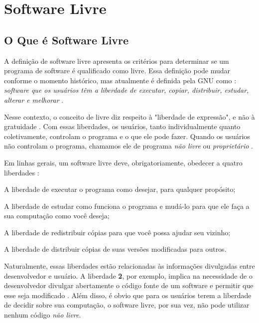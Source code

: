 


\chapter{Software Livre}
\label{chap:SoftwareLivre}

\section{O Que é Software Livre}

A definição de software livre apresenta os critérios para determinar se um programa de software é qualificado como livre. Essa definição pode mudar conforme o momento histórico, mas atualmente é definida pela GNU como : \textit{software que os usuários têm a liberdade de executar, copiar, distribuir, estudar, alterar e melhorar} \cite{Inc2012} . 

Nesse contexto, o conceito de livre diz respeito à "liberdade de expressão", e não à gratuidade \cite{Williams}. Com essas liberdades, os usuários, tanto individualmente quanto coletivamente, controlam o programa e o que ele pode fazer. Quando os usuários não controlam o programa, chamamos ele de programa \textit{não livre} ou \textit{proprietário} \cite{Inc2012}. 

Em linhas gerais, um software livre deve, obrigatoriamente, obedecer a quatro liberdades \cite{Inc2012, Williams, Lessig2002} :
\begin{compactenum}
	\item A liberdade de executar o programa como desejar, para qualquer propósito;
	\item A liberdade de estudar como funciona o programa e mudá-lo para que ele faça a sua computação como você deseja;
	\item A liberdade de redistribuir cópias para que você possa ajudar seu vizinho;
	\item A liberdade de distribuir cópias de suas versões modificadas para outros.
\end{compactenum}

Naturalmente, essas liberdades estão relacionadas às informações divulgadas entre desenvolvedor e usuário. A liberdade \textbf{2}, por exemplo, implica na necessidade de o desenvolvedor divulgar abertamente o código fonte de um software e permitir que esse seja modificado \cite{Inc2012}. Além disso, é obvio que para os usuários terem a liberdade de decidir sobre sua computação, o software livre, por sua vez, não pode utilizar nenhum código \textit{não livre}.

